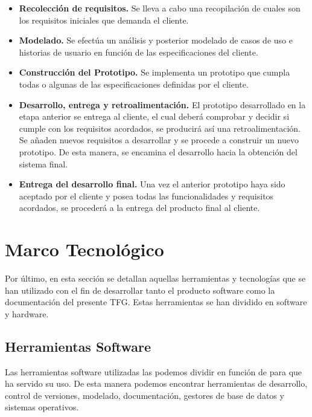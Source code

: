 
\begin{itemize}
	\item \textbf{Recolección de requisitos.} Se lleva a cabo una recopilación de cuales son los requisitos iniciales que demanda el cliente.
	\item \textbf{Modelado.} Se efectúa un análisis y posterior modelado de casos de uso e historias de usuario en función de las especificaciones del cliente.
	\item \textbf{Construcción del Prototipo.} Se implementa un prototipo que cumpla todas o algunas de las especificaciones definidas por el cliente.
	\item \textbf{Desarrollo, entrega y retroalimentación.} El prototipo desarrollado en la etapa anterior se entrega al cliente, el cual deberá comprobar y decidir si cumple con los requisitos acordados, se producirá así una retroalimentación. Se añaden nuevos requisitos a desarrollar y se procede a construir un nuevo prototipo. De esta manera, se encamina el desarrollo hacia la obtención del sistema final.
	\item \textbf{Entrega del desarrollo final.} Una vez el anterior prototipo haya sido aceptado por el cliente y posea todas las funcionalidades y requisitos acordados, se procederá a la entrega del producto final al cliente.
\end{itemize}

\section{Marco Tecnológico}
\label{sec:MarcoTecnologico}

Por último, en esta sección se detallan aquellas herramientas y tecnologías que se han utilizado con el fin de desarrollar tanto el producto software como la documentación del presente TFG. Estas herramientas se han dividido en software y hardware.

\subsection{Herramientas Software}
\label{sec:HerramientasSoftware}

Las herramientas software utilizadas las podemos dividir en función de para que ha servido su uso. De esta manera podemos encontrar herramientas de desarrollo, control de versiones, modelado, documentación, gestores de base de datos y sistemas operativos.

